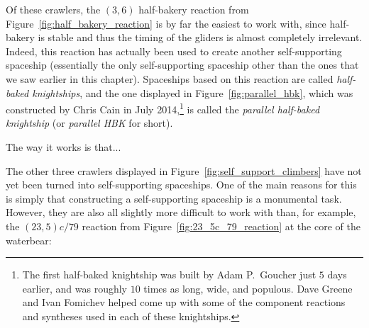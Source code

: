 Of these crawlers, the $(3,6)$ half-bakery reaction from Figure~\ref{fig:half_bakery_reaction} is by far the easiest to work with, since half-bakery is stable and thus the timing of the gliders is almost completely irrelevant. Indeed, this reaction has actually been used to create another self-supporting spaceship (essentially the only self-supporting spaceship other than the ones that we saw earlier in this chapter). Spaceships based on this reaction are called \emph{half-baked knightships}, and the one displayed in Figure~\ref{fig:parallel_hbk}, which was constructed by Chris Cain in July 2014,\footnote{The first half-baked knightship was built by Adam P.~Goucher just $5$ days earlier, and was roughly $10$ times as long, wide, and populous. Dave Greene and Ivan Fomichev helped come up with some of the component reactions and syntheses used in each of these knightships.} is called the \emph{parallel half-baked knightship} (or \emph{parallel HBK} for short).


The way it works is that...

The other three crawlers displayed in Figure~\ref{fig:self_support_climbers} have not yet been turned into self-supporting spaceships. One of the main reasons for this is simply that constructing a self-supporting spaceship is a monumental task. However, they are also all slightly more difficult to work with than, for example, the $(23,5)c/79$ reaction from Figure~\ref{fig:23_5c_79_reaction} at the core of the waterbear:\smallskip

